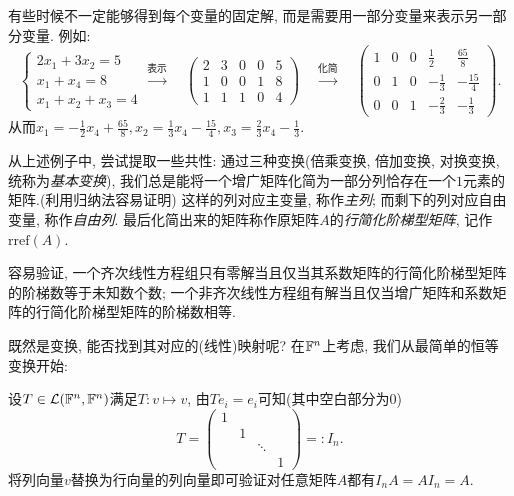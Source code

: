 有些时候不一定能够得到每个变量的固定解, 而是需要用一部分变量来表示另一部分变量. 例如: $$\begin{cases}
	2x_1+3x_2=5 \\ x_1+x_4=8 \\ x_1+x_2+x_3=4
\end{cases}  \stackrel{\textit{表示}}{\longrightarrow} \quad \left(
\begin{array}{cccc|c}
  2 & 3 & 0 & 0 & 5 \\
  1 & 0 & 0 & 1 & 8 \\
  1 & 1 & 1 & 0 & 4
\end{array}
\right) \quad \stackrel{\textit{化简}}{\longrightarrow} \quad \left(
\begin{array}{cccc|c}
  1 & 0 & 0 & \frac{1}{2} & \frac{65}{8} \\
  0 & 1 & 0 & -\frac{1}{3} & -\frac{15}{4} \\
  0 & 0 & 1 & -\frac{2}{3} & -\frac{1}{3}
\end{array}
\right).$$
从而$x_1 = -\frac{1}{2}x_4+\frac{65}{8}, x_2=\frac{1}{3}x_4-\frac{15}{4},x_3=\frac{2}{3}x_4-\frac{1}{3}$. 

从上述例子中, 尝试提取一些共性: 通过三种变换(倍乘变换, 倍加变换, 对换变换, 统称为\textit{基本变换}), 我们总是能将一个增广矩阵化简为一部分列恰存在一个$1$元素的矩阵.(利用归纳法容易证明) 这样的列对应主变量, 称作\textit{主列}; 而剩下的列对应自由变量, 称作\textit{自由列}. 最后化简出来的矩阵称作原矩阵$A$的\textit{行简化阶梯型矩阵}, 记作$\textrm{rref}(A)$. 

容易验证, 一个齐次线性方程组只有零解当且仅当其系数矩阵的行简化阶梯型矩阵的阶梯数等于未知数个数; 一个非齐次线性方程组有解当且仅当增广矩阵和系数矩阵的行简化阶梯型矩阵的阶梯数相等. 

既然是变换, 能否找到其对应的(线性)映射呢? 在$\mathbb{F} ^n$上考虑, 我们从最简单的恒等变换开始: 

设$T \in \mathcal{L} (\mathbb{F} ^n,\mathbb{F} ^n)$满足$T:v \mapsto v$, 由$Te_i=e_i$可知(其中空白部分为$0$)$$T=\left( \begin{smallmatrix}
	 1 &   &   &   \\
	   & 1 &   &   \\
	   &   &\ddots &   \\
	   &   &   & 1     
\end{smallmatrix} \right) =: I_n.$$
将列向量$v$替换为行向量的列向量即可验证对任意矩阵$A$都有$I_nA=AI_n=A$. 

